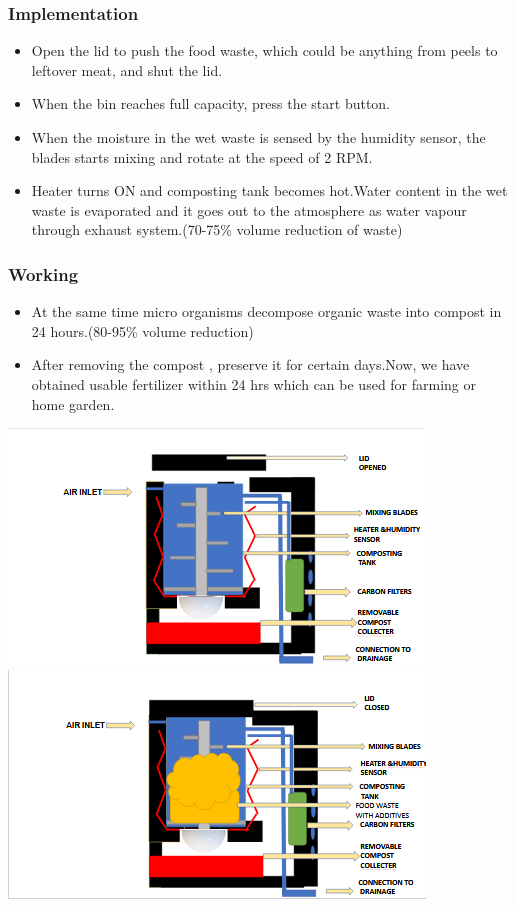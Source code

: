 \documentclass[11pt]{beamer}
\begin{document}
\begin{frame}
\frametitle{Implementation}
\begin{itemize}
\item Open the lid to push the food waste, which could be anything from peels to leftover meat, and shut the lid.\item When the bin reaches full capacity, press the start button.\item When the moisture in the wet waste is sensed by the humidity sensor, the blades starts mixing and rotate at the speed of 2 RPM.\item Heater turns ON and composting tank becomes hot.Water content in the wet waste is evaporated and it goes out to the atmosphere as water vapour through exhaust system.(70-75\% volume reduction of waste)
\end{itemize}
\end{frame}
\begin{frame}
	\frametitle{Working}
	\begin{itemize}	
	\item At the same time micro organisms decompose organic waste into compost in 24 hours.(80-95\% volume reduction) \item After removing  the compost , preserve it for certain days.Now, we have obtained usable fertilizer within 24 hrs which can be used for farming or home garden.  
	\end{itemize}
 \includegraphics[height=0.35\textheight]{image.png}
 \hfill
 \includegraphics[height=0.35\textheight]{image1.png}
 \end{frame}
\end{document}
